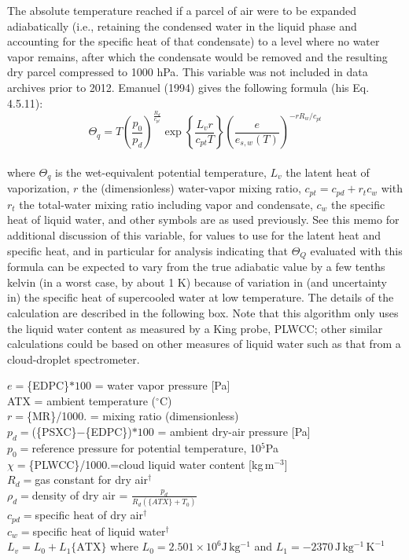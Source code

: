 \documentclass[
  english,
]{book}
\begin{document}
The absolute temperature reached if a parcel of air were to be expanded adiabatically (i.e., retaining the condensed water in the liquid phase and accounting for the specific heat of that condensate) to a level where no water vapor remains, after which the condensate would be removed and the resulting dry parcel compressed to 1000 hPa. This variable was not included in data archives prior to 2012. Emanuel (1994) gives the following formula (his Eq. 4.5.11):\\
\begin{equation}
\Theta_{q}=T(\frac{p_{0}}{p_{d}})^{\frac{R_{d}}{c_{pt}}}\exp\left\{ \frac{L_{v}r}{c_{pt}T}\right\} \left(\frac{e}{e_{s,w}(T)}\right)^{-rR_{w}/c_{pt}}
\label{eq:THETAQ}
\end{equation}\\
where \(\Theta_q\) is the wet-equivalent potential temperature, \(L_v\) the latent heat of vaporization, \(r\) the (dimensionless) water-vapor mixing ratio, \(c_{pt} = c_{pd}+r_tc_w\) with \(r_t\) the total-water mixing ratio including vapor and condensate, \(c_w\) the specific heat of liquid water, and other symbols are as used previously. See this memo for additional discussion of this variable, for values to use for the latent heat and specific heat, and in particular for analysis indicating that \(\Theta_Q\) evaluated with this formula can be expected to vary from the true adiabatic value by a few tenths kelvin (in a worst case, by about 1 K) because of variation in (and uncertainty in) the specific heat of supercooled water at low temperature. The details of the calculation are described in the following box. Note that this algorithm only uses the liquid water content as measured by a King probe, PLWCC; other similar calculations could be based on other measures of liquid water such as that from a cloud-droplet spectrometer.

\(e=\)\{EDPC\}\(*100\) = water vapor pressure {[}Pa{]}\\
ATX = ambient temperature (\(^{\circ}\mathrm{C}\))\\
\(r=\)\{MR\}/1000. = mixing ratio (dimensionless)\\
\(p_{d}=\)(\{PSXC\}\(-\)\{EDPC\})\(*100\) = ambient dry-air pressure {[}Pa{]}\\
\(p_{0}=\)reference pressure for potential temperature, 10\(^{5}\)Pa\\
\(\chi=\)\{PLWCC\}/1000.=cloud liquid water content {[}kg\(\,\)m\(^{-3}\){]}\\
\(R_{d}=\)gas constant for dry air\(^{\dagger}\)\\
\(\rho_{d}=\)density of dry air = \(\frac{p_{d}}{R_{d}(\{ATX\}+T_{0})}\)\\
\(c_{pd}=\)specific heat of dry air\(^{\dagger}\)\\
\(c_{w}=\)specific heat of liquid water\(^{\dagger}\)\\
\(L_{v}=L_{0}+L_{1}\mathrm{\{ATX\}}\) where \(L_{0}=2.501\times10^{6}\mathrm{J}\,\mathrm{kg^{-1}}\)
and \(L_{1}=-2370\,\mathrm{J\,\mathrm{kg^{-1}\,\mathrm{K^{-1}}}}\)
\end{document}
